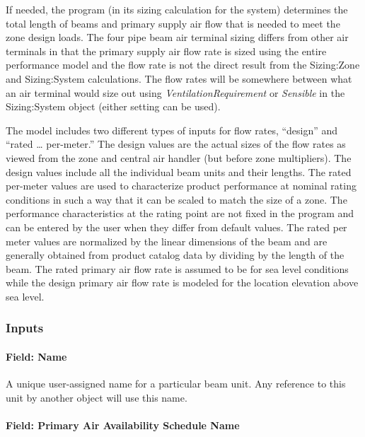 If needed, the program (in its sizing calculation for the system) determines the total length of beams and primary supply air flow that is needed to meet the zone design loads. The four pipe beam air terminal sizing differs from other air terminals in that the primary supply air flow rate is sized using the entire performance model and the flow rate is not the direct result from the Sizing:Zone and Sizing:System calculations. The flow rates will be somewhere between what an air terminal would size out using \emph{VentilationRequirement} or \emph{Sensible} in the Sizing:System object (either setting can be used).

The model includes two different types of inputs for flow rates, ``design'' and ``rated \ldots{} per-meter.'' The design values are the actual sizes of the flow rates as viewed from the zone and central air handler (but before zone multipliers). The design values include all the individual beam units and their lengths. The rated per-meter values are used to characterize product performance at nominal rating conditions in such a way that it can be scaled to match the size of a zone. The performance characteristics at the rating point are not fixed in the program and can be entered by the user when they differ from default values. The rated per meter values are normalized by the linear dimensions of the beam and are generally obtained from product catalog data by dividing by the length of the beam. The rated primary air flow rate is assumed to be for sea level conditions while the design primary air flow rate is modeled for the location elevation above sea level.

\subsubsection{Inputs}\label{inputs-10-000}

\paragraph{Field: Name}\label{field-name-10-000}

A unique user-assigned name for a particular beam unit. Any reference to this unit by another object will use this name.

\paragraph{Field: Primary Air Availability Schedule Name}\label{field-primary-air-availability-schedule-name}

